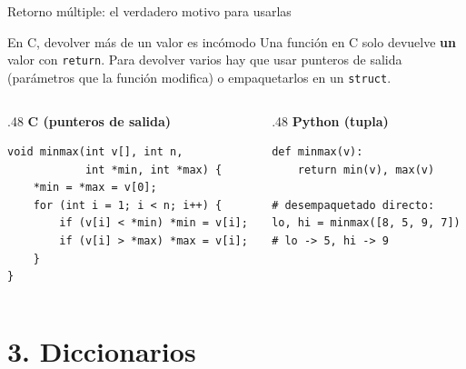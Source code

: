 \documentclass{beamer}
\begin{document}
\begin{frame}[fragile]{Retorno múltiple: el verdadero motivo para usarlas}
  \begin{alertblock}{En C, devolver más de un valor es incómodo}
    Una función en C solo devuelve \textbf{un} valor con \texttt{return}.
    Para devolver varios hay que usar punteros de salida (parámetros que
    la función modifica) o empaquetarlos en un \texttt{struct}.
  \end{alertblock}
  \begin{columns}[T]
    \begin{column}{.48\textwidth}
      \centering\textbf{C (punteros de salida)}
      \begin{verbatim}
void minmax(int v[], int n,
            int *min, int *max) {
    *min = *max = v[0];
    for (int i = 1; i < n; i++) {
        if (v[i] < *min) *min = v[i];
        if (v[i] > *max) *max = v[i];
    }
}
      \end{verbatim}
    \end{column}
    \begin{column}{.48\textwidth}
      \centering\textbf{Python (tupla)}
      \begin{verbatim}
def minmax(v):
    return min(v), max(v)

# desempaquetado directo:
lo, hi = minmax([8, 5, 9, 7])
# lo -> 5, hi -> 9
      \end{verbatim}
    \end{column}
  \end{columns}
\end{frame}

\section{3. Diccionarios}
\end{document}
